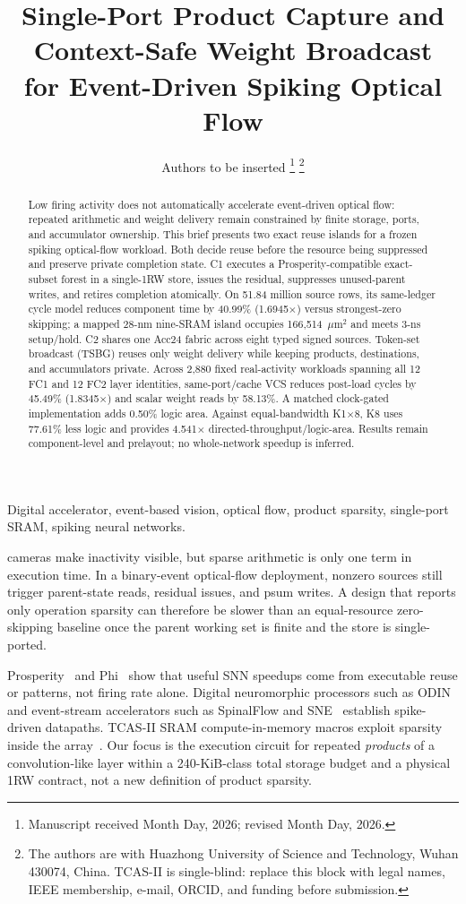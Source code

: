 \documentclass[journal]{IEEEtran}
\title{Single-Port Product Capture and Context-Safe Weight Broadcast\\
for Event-Driven Spiking Optical Flow}
\author{Authors to be inserted%
\thanks{Manuscript received Month Day, 2026; revised Month Day, 2026.}%
\thanks{The authors are with Huazhong University of Science and Technology,
Wuhan 430074, China. TCAS-II is single-blind: replace this block with legal
names, IEEE membership, e-mail, ORCID, and funding before submission.}}
\begin{document}
\maketitle

\begin{abstract}
Low firing activity does not automatically accelerate event-driven optical
flow: repeated arithmetic and weight delivery remain constrained by finite
storage, ports, and accumulator ownership.  This brief presents two exact
reuse islands for a frozen spiking optical-flow workload.  Both decide reuse
before the resource being suppressed and preserve private completion state.
C1 executes a
Prosperity-compatible exact-subset forest in a single-1RW
store, issues the residual, suppresses unused-parent writes, and retires completion
atomically.  On 51.84 million source rows, its same-ledger cycle model reduces
component time by 40.99\% (1.6945$\times$) versus strongest-zero skipping; a
mapped 28-nm nine-SRAM island occupies 166{,}514~$\mu$m$^2$ and meets 3-ns
setup/hold.  C2 shares one Acc24 fabric across eight typed signed sources.
Token-set broadcast (TSBG) reuses only weight delivery while keeping products,
destinations, and accumulators private.  Across 2,880 fixed real-activity
workloads spanning all 12 FC1 and 12 FC2 layer identities, same-port/cache VCS
reduces post-load cycles by 45.49\% (1.8345$\times$) and scalar weight reads by
58.13\%.  A matched clock-gated implementation adds 0.50\% logic area.
Against equal-bandwidth
K1$\times$8, K8 uses 77.61\%
less logic and provides 4.541$\times$ directed-throughput/logic-area.  Results
remain component-level and prelayout; no whole-network speedup is inferred.
\end{abstract}

\begin{IEEEkeywords}
Digital accelerator, event-based vision, optical flow, product sparsity,
single-port SRAM, spiking neural networks.
\end{IEEEkeywords}

 cameras make inactivity visible, but sparse arithmetic
is only one term in execution time.  In a binary-event optical-flow
deployment, nonzero sources still trigger parent-state reads, residual
issues, and psum writes.  A design that reports only operation sparsity can
therefore be slower than an equal-resource zero-skipping baseline once the
parent working set is finite and the store is single-ported.

Prosperity~\cite{prosperity} and Phi~\cite{phi} show that useful SNN speedups
come from executable reuse or patterns, not firing rate alone.  Digital
neuromorphic processors such as ODIN~\cite{frenkel2019odin} and
event-stream accelerators such as SpinalFlow and SNE~\cite{spinalflow,sne}
establish spike-driven datapaths.  TCAS-II SRAM compute-in-memory macros
exploit sparsity inside the array~\cite{qiao2022dscim,taylor2022pim}.  Our
focus is the execution circuit for repeated \emph{products} of a
convolution-like layer within a 240-KiB-class total storage budget and a
physical 1RW contract, not a new definition of product sparsity.
\end{document}
